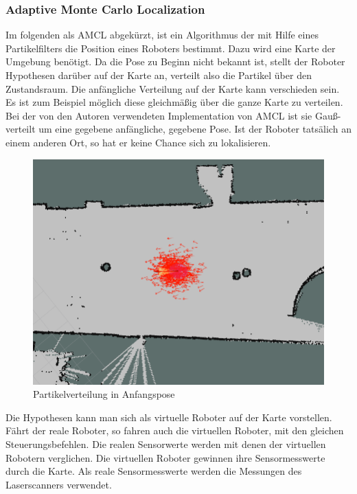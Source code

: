 \documentclass[11pt,a4paper]{article}
\begin{document}
\subsubsection{Adaptive Monte Carlo Localization} \cite{mclWiki}
{
	Im folgenden als AMCL abgek\"urzt, ist ein Algorithmus der mit Hilfe eines Partikelfilters die Position eines Roboters bestimmt. Dazu wird eine Karte der Umgebung ben\"otigt. Da die Pose zu Beginn nicht bekannt ist, stellt der Roboter Hypothesen dar\"uber auf der Karte an, verteilt also die Partikel \"uber den Zustandsraum. Die anf\"angliche Verteilung auf der Karte kann verschieden sein. Es ist zum Beispiel m\"oglich diese  gleichm\"a{\ss}ig über die ganze Karte zu verteilen. 
	Bei der von den Autoren verwendeten Implementation von AMCL ist sie Gau{\ss}-verteilt um eine gegebene anf\"angliche, gegebene Pose. Ist der Roboter tatsälich an einem anderen Ort, so hat er keine Chance sich zu lokalisieren. 

\begin{figure}[h]
	\includegraphics[width=\linewidth]{pictures/initial_distribution.jpg}
	\caption{Partikelverteilung in Anfangspose}
\end{figure}
	
	Die Hypothesen kann man sich als virtuelle Roboter auf der Karte vorstellen. F\"ahrt der reale Roboter, so fahren auch die virtuellen Roboter, mit den gleichen Steuerungsbefehlen. Die realen Sensorwerte werden mit denen der virtuellen Robotern verglichen. Die virtuellen Roboter gewinnen ihre Sensormesswerte durch die Karte. Als reale Sensormesswerte werden die Messungen des Laserscanners verwendet.
	
}
\end{document}
